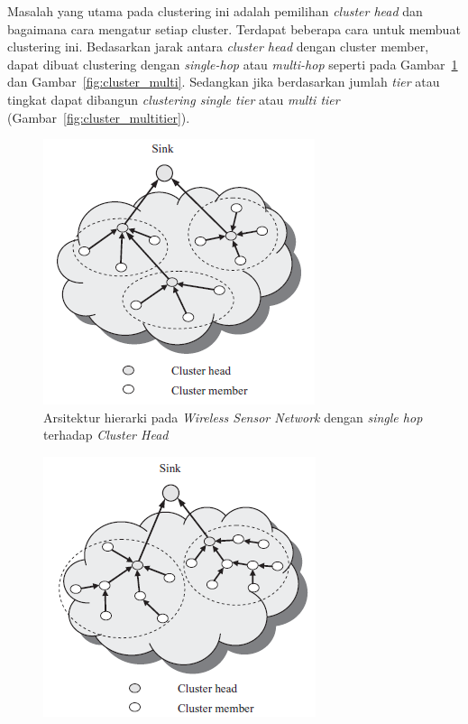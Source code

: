 \documentclass[a4paper,twoside]{article}
\begin{document}
\begin{enumerate}
\begin{itemize}
\begin{itemize}
Masalah yang utama pada clustering ini adalah pemilihan \textit{cluster head} dan bagaimana cara mengatur setiap cluster. Terdapat beberapa cara untuk membuat clustering ini. Bedasarkan jarak antara \textit{cluster head} dengan cluster member, dapat dibuat clustering dengan \textit{single-hop} atau \textit{multi-hop} seperti pada Gambar~\ref{fig:cluster_single} dan Gambar~\ref{fig:cluster_multi}. Sedangkan jika berdasarkan jumlah \textit{tier} atau tingkat dapat dibangun \textit{clustering single tier} atau \textit{multi tier} (Gambar~\ref{fig:cluster_multitier}).
\begin{figure} [H]
	\centering  
	\includegraphics[scale=0.7]{Gambar/cluster_single}  
	\caption[Arsitektur hierarki pada \textit{Wireless Sensor Network} dengan \textit{single hop} terhadap \textit{Cluster Head}]{Arsitektur hierarki pada \textit{Wireless Sensor Network} dengan \textit{single hop} terhadap \textit{Cluster Head}} 
	\label{fig:cluster_single} 
\end{figure} 
\begin{figure} [H]
	\centering  
	\includegraphics[scale=0.7]{Gambar/cluster_multi}  

\end{figure}
\end{itemize}
\end{itemize}
\end{enumerate}
\end{document}
